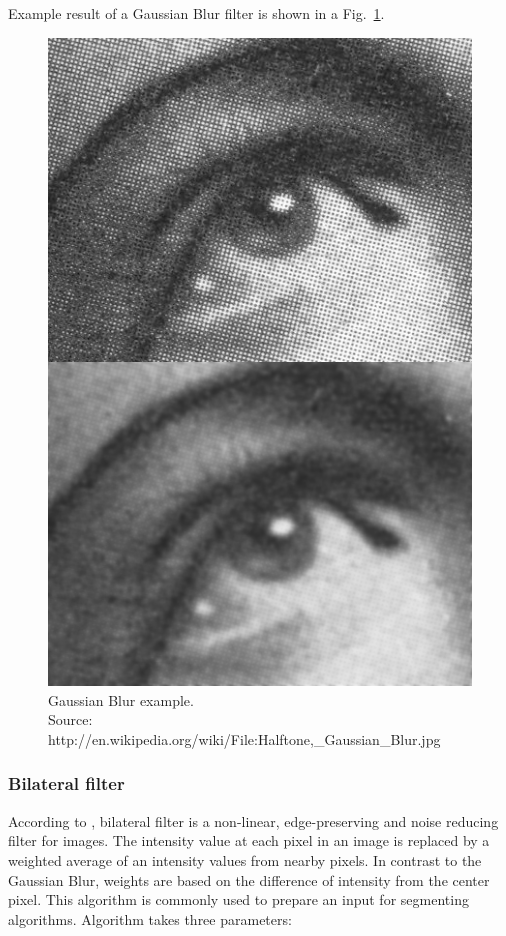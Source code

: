 \documentclass[a4paper,onecolumn,oneside,12pt]{memoir}
\begin{document}
Example result of a Gaussian Blur filter is shown in a Fig.~\ref{gaussianBlurExample}.

\begin{figure}[ht]
\begin{center}
\includegraphics[scale=1.0]{images/GaussianBlurExample.jpg}
\caption{Gaussian Blur example. \\
Source: http://en.wikipedia.org/wiki/File:Halftone,\_Gaussian\_Blur.jpg}
\label{gaussianBlurExample}
\end{center}
\end{figure}

\subsubsection{Bilateral filter}

According to \cite{bilateralFilterWiki}, bilateral filter is a non-linear, edge-preserving and
noise reducing filter for images. The intensity value at each pixel in an image is replaced by a
weighted average of an intensity values from nearby pixels. In contrast to the Gaussian Blur, 
weights are based on the difference of intensity from the center pixel. This algorithm is commonly
used to prepare an input for segmenting algorithms. Algorithm takes three parameters:
\end{document}
